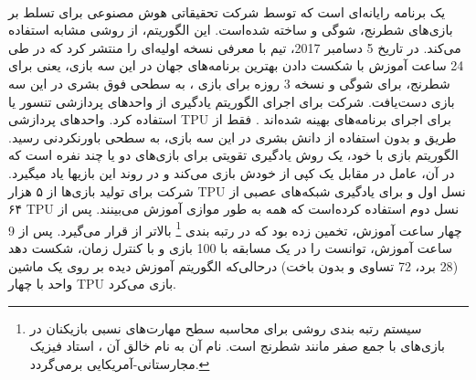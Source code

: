    
   

%
  
  

\paragraph{}
یک برنامه رایانه‌ای است که توسط شرکت تحقیقاتی هوش مصنوعی
 برای تسلط بر بازی‌های شطرنج، شوگی و 
ساخته شده‌است. این الگوریتم، از روشی مشابه
  استفاده می‌کند. در تاریخ 5 دسامبر 2017، تیم
  با معرفی
   نسخه اولیه‌ای را منتشر کرد که در طی 24 ساعت آموزش با شکست دادن بهترین برنامه‌های جهان در این سه بازی، یعنی
    برای شطرنج،
برای شوگی و نسخه 3 روزه
برای بازی 
،
به سطحی فوق بشری در این سه بازی دست‌یافت.  شرکت 
برای اجرای الگوریتم یادگیری
از واحدهای پردازشی تنسور 
یا 
استفاده کرد. واحدهای پردازشی TPU برای اجرای برنامه‌های
بهینه شده‌اند
\cite{silver2017}.
  فقط از طریق 
و بدون استفاده از دانش بشری در این سه بازی، به سطحی باورنکردنی رسید. الگوریتم بازی با خود، یک روش یادگیری تقویتی برای بازی‌های دو یا چند نفره است که در آن، عامل در مقابل یک کپی از خودش بازی می‌کند و در روند این بازی\nf ها یاد می\nf گیرد.
شرکت
  برای تولید  بازی‌ها از ۵ هزار TPU نسل اول و برای یادگیری شبکه‌های عصبی از ۶۴ TPU نسل دوم استفاده کرده‌است که همه به طور موازی آموزش می‌بینند.
پس از چهار ساعت آموزش،
  تخمین زده بود که
    در رتبه بندی
\footnote{سیستم رتبه بندی
	  روشی برای محاسبه سطح مهارت‌های نسبی بازیکنان در بازی‌های با جمع صفر مانند شطرنج است. نام آن به نام خالق آن
،
استاد فیزیک مجارستانی-آمریکایی برمی‌گردد.}
بالاتر از
  قرار می‌گیرد. پس از 9 ساعت آموزش، توانست
را در یک مسابقه با 100 بازی و با کنترل زمان، شکست دهد (28 برد، 72 تساوی و بدون باخت) 
\cite{silver2017} \cite{knapton2017entire} \cite{superhuman2017}
درحالی‌که الگوریتم آموزش دیده 
بر روی یک ماشین واحد با چهار TPU بازی می‌کرد.

